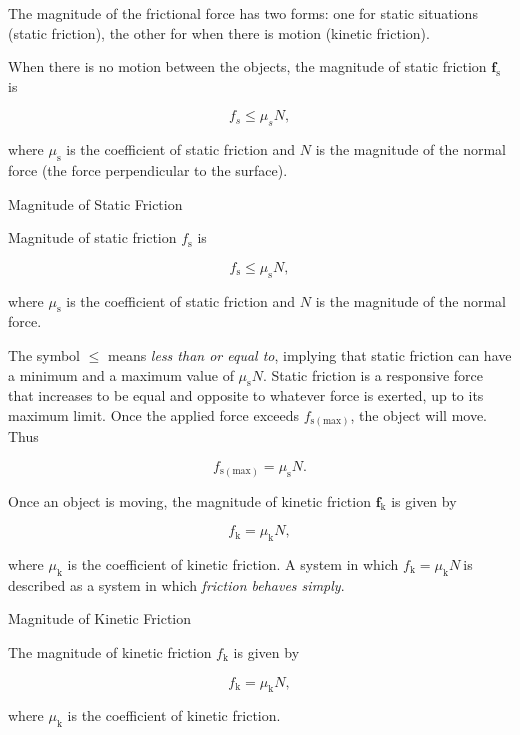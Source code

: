 \documentclass[
]{book}
\newenvironment{note}{}{}
\begin{document}
The magnitude of the frictional force has two forms: one for static
situations (static friction), the other for when there is motion
(kinetic friction).

When there is no motion between the objects, the \protect\hypertarget{import-auto-id1165298867639}{}{magnitude of static
friction \(\mathbf{f}_{\text{s}}{}\)} is

\leavevmode\hypertarget{eip-70}{}%
\[{{{f_{s} \leq \mu_{s}}N},}{}\]

where \(\mu_{\text{s}}{}\) is the coefficient of static friction and \(N\)
is the magnitude of the normal force
\textbf{}(the force perpendicular to the
surface).

\hypertarget{fs-id1911080}{}
\begin{note}

Magnitude of Static Friction

Magnitude of static friction \(f_{\text{s}}{}\) is

\leavevmode\hypertarget{eip-213}{}%
\[{{{f_{\text{s}} \leq \mu_{\text{s}}}N},}{}\]

where \(\mu_{\text{s}}{}\) is the coefficient of static friction and \(N\)
is the magnitude of the normal force.

\end{note}

The symbol \(\leq {}\) means \emph{less than or equal to}, implying that static
friction can have a minimum and a maximum value of
\({\mu_{\text{s}}N}{}\). Static friction is a responsive force that
increases to be equal and opposite to whatever force is exerted, up to
its maximum limit. Once the applied force exceeds
\(f_{\text{s}(\text{max})}{}\), the object will move. Thus

\leavevmode\hypertarget{eip-410}{}%
\[{{{f_{\text{s}(\text{max})} = \mu_{\text{s}}}N}.}{}\]

Once an object is moving, the \protect\hypertarget{import-auto-id1165298998067}{}{magnitude of kinetic friction
\(\mathbf{f}_{\text{k}}{}\)} is given by

\leavevmode\hypertarget{eip-98}{}%
\[{{{f_{\text{k}} = \mu_{\text{k}}}N},}{}\]

where \(\mu_{\text{k}}{}\) is the coefficient of kinetic friction. A
system in which \({{{f_{\text{k}} = \mu_{\text{k}}}N}\ }{}\)is described
as a system in which \emph{friction behaves simply}.

\hypertarget{fs-id1318642}{}
\begin{note}

Magnitude of Kinetic Friction

The magnitude of kinetic friction \(f_{\text{k}}{}\) is given by

\leavevmode\hypertarget{eip-40}{}%
\[{{{f_{\text{k}} = \mu_{\text{k}}}N},}{}\]

where \(\mu_{\text{k}}{}\) is the coefficient of kinetic friction.

\end{note}
\end{document}
